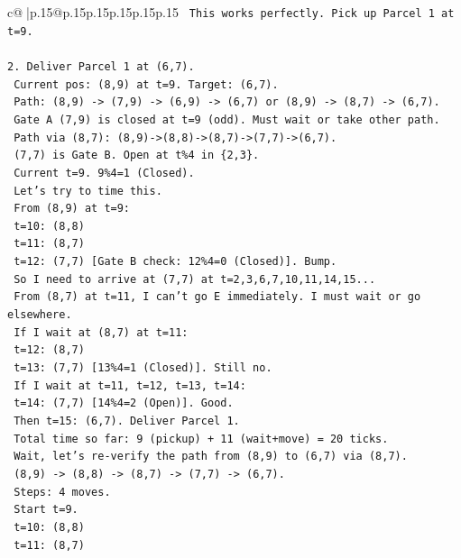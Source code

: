 \documentclass{article}
\begin{document}
{\begin{supertabular}{c@{$\;$}|p{.15\linewidth}@{}p{.15\linewidth}p{.15\linewidth}p{.15\linewidth}p{.15\linewidth}p{.15\linewidth}}
{{{\texttt{       This works perfectly. Pick up Parcel 1 at t=9.} \\
\\ 
\texttt{2. Deliver Parcel 1 at (6,7).} \\
\texttt{   Current pos: (8,9) at t=9. Target: (6,7).} \\
\texttt{   Path: (8,9) {-}> (7,9) {-}> (6,9) {-}> (6,7) or (8,9) {-}> (8,7) {-}> (6,7).} \\
\texttt{   Gate A (7,9) is closed at t=9 (odd). Must wait or take other path.} \\
\texttt{   Path via (8,7): (8,9){-}>(8,8){-}>(8,7){-}>(7,7){-}>(6,7).} \\
\texttt{   (7,7) is Gate B. Open at t\%4 in \{2,3\}.} \\
\texttt{   Current t=9. 9\%4=1 (Closed).} \\
\texttt{   Let's try to time this.} \\
\texttt{   From (8,9) at t=9:} \\
\texttt{   t=10: (8,8)} \\
\texttt{   t=11: (8,7)} \\
\texttt{   t=12: (7,7) {[}Gate B check: 12\%4=0 (Closed){]}. Bump.} \\
\texttt{   So I need to arrive at (7,7) at t=2,3,6,7,10,11,14,15...} \\
\texttt{   From (8,7) at t=11, I can't go E immediately. I must wait or go elsewhere.} \\
\texttt{   If I wait at (8,7) at t=11:} \\
\texttt{   t=12: (8,7)} \\
\texttt{   t=13: (7,7) {[}13\%4=1 (Closed){]}. Still no.} \\
\texttt{   If I wait at t=11, t=12, t=13, t=14:} \\
\texttt{   t=14: (7,7) {[}14\%4=2 (Open){]}. Good.} \\
\texttt{   Then t=15: (6,7). Deliver Parcel 1.} \\
\texttt{   Total time so far: 9 (pickup) + 11 (wait+move) = 20 ticks.} \\
\texttt{   Wait, let's re{-}verify the path from (8,9) to (6,7) via (8,7).} \\
\texttt{   (8,9) {-}> (8,8) {-}> (8,7) {-}> (7,7) {-}> (6,7).} \\
\texttt{   Steps: 4 moves.} \\
\texttt{   Start t=9.} \\
\texttt{   t=10: (8,8)} \\
\texttt{   t=11: (8,7)} \\
}}}
\end{supertabular}}
\end{document}
